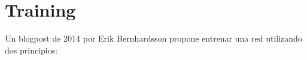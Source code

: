 
\section{Training}

\begin{frame}
Un blogpost de 2014 por Erik Bernhardsson propone entrenar una red utilizando dos principios:

\end{frame}
